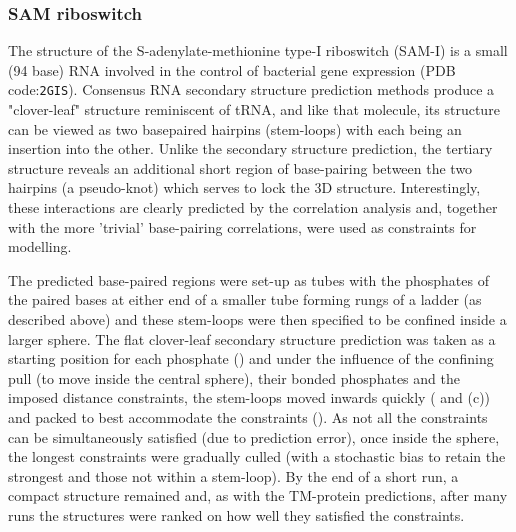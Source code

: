 \subsubsection{SAM riboswitch}

The structure of the S-adenylate-methionine type-I riboswitch (SAM-I) is a small (94 base) RNA involved
in the control of bacterial gene expression (PDB code:{\tt 2GIS}).   Consensus RNA secondary structure
prediction methods \cite{HofackerIL03} produce a "clover-leaf" structure reminiscent of tRNA, and like that molecule, its
structure can be viewed as two basepaired hairpins (stem-loops) with each being an insertion into the
other.  Unlike the secondary structure prediction, the tertiary structure reveals an additional
short region of base-pairing between the two hairpins (a pseudo-knot) which serves
to lock the 3D structure.   Interestingly, these interactions are clearly predicted
by the correlation analysis and, together with the more 'trivial' base-pairing
correlations, were used as constraints for modelling.

The predicted base-paired regions were set-up as tubes with the phosphates of the paired bases
at either end of a smaller tube forming rungs of a ladder (as described above) and these stem-loops
were then specified to be confined inside a larger sphere.    The flat clover-leaf secondary structure
prediction was taken as a starting position for each phosphate () and under the
influence of the confining pull (to move inside the central sphere), their bonded phosphates
and the imposed distance constraints, the stem-loops moved inwards quickly ( and (c))
and packed to best accommodate the constraints ().    As not all the constraints can be
simultaneously satisfied (due to prediction error), once inside the sphere,
the longest constraints were gradually culled (with a stochastic bias to retain the
strongest and those not within a stem-loop).   By the end of a short run, a compact
structure remained and, as with the TM-protein predictions, after many runs the structures
were ranked on how well they satisfied the constraints.

